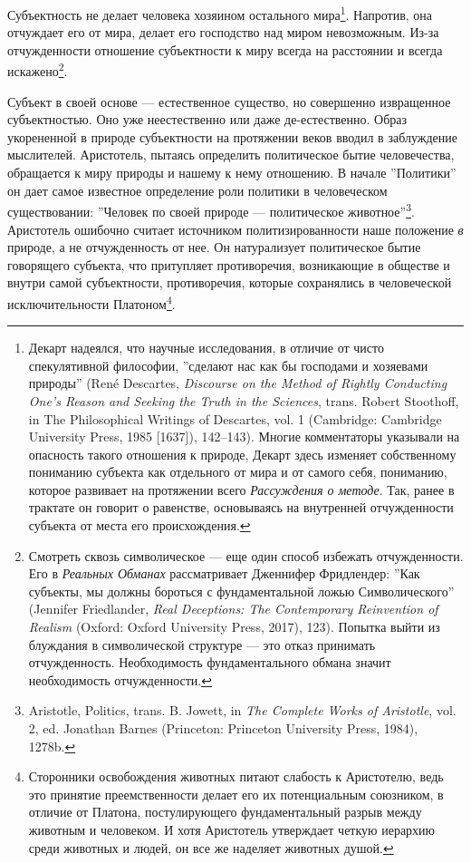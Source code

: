 \documentclass[12pt]{book}
\begin{document}
Субъектность не делает человека хозяином остального мира\footnote{Декарт надеялся, что научные исследования, в отличие от чисто спекулятивной философии, ''сделают нас как бы господами и хозяевами природы'' (René Descartes, \textit{Discourse on the Method of Rightly Conducting One’s Reason and Seeking the Truth in the Sciences}, trans. Robert Stoothoff, in The Philosophical Writings of Descartes, vol. 1 (Cambridge: Cambridge University Press, 1985 [1637]), 142–143). Многие комментаторы указывали на опасность такого отношения к природе, Декарт здесь изменяет собственному пониманию субъекта как отдельного от мира и от самого себя, пониманию, которое развивает на протяжении всего \textit{Рассуждения о методе}. Так, ранее в трактате он говорит о равенстве, основываясь на внутренней отчужденности субъекта от места его происхождения.}. Напротив, она отчуждает его от мира, делает его господство над миром невозможным. Из-за отчужденности отношение субъектности к миру всегда на расстоянии и всегда искажено\footnote{Смотреть сквозь символическое --- еще один способ избежать отчужденности. Его в \textit{Реальных Обманах} рассматривает Дженнифер Фридлендер: ''Как субъекты, мы должны бороться с фундаментальной ложью Символического'' (Jennifer Friedlander, \textit{Real Deceptions: The Contemporary Reinvention of Realism} (Oxford: Oxford University Press, 2017), 123). Попытка выйти из блуждания в символической структуре --- это отказ принимать отчужденность. Необходимость фундаментального обмана значит необходимость отчужденности.}.

Субъект в своей основе --- естественное существо, но совершенно извращенное субъектностью. Оно уже неестественно или даже де-естественно. Образ укорененной в природе субъектности на протяжении веков вводил в заблуждение мыслителей. Аристотель, пытаясь определить политическое бытие человечества, обращается к миру природы и нашему к нему отношению. В начале ''Политики'' он дает самое известное определение роли политики в человеческом существовании: ''Человек по своей природе --- политическое животное''\footnote{Aristotle, Politics, trans. B. Jowett, in \textit{The Complete Works of Aristotle}, vol. 2, ed. Jonathan Barnes (Princeton: Princeton University Press, 1984), 1278b.}. Аристотель ошибочно считает источником политизированности наше положение \textit{в} природе, а не отчужденность от нее. Он натурализует политическое бытие говорящего субъекта, что притупляет противоречия, возникающие в обществе и внутри самой субъектности, противоречия, которые сохранялись в человеческой исключительности Платоном\footnote{Сторонники освобождения животных питают слабость к Аристотелю, ведь это принятие преемственности делает его их потенциальным союзником, в отличие от Платона, постулирующего фундаментальный разрыв между животным и человеком. И хотя Аристотель утверждает четкую иерархию среди животных и людей, он все же наделяет животных душой.}.
\end{document}
